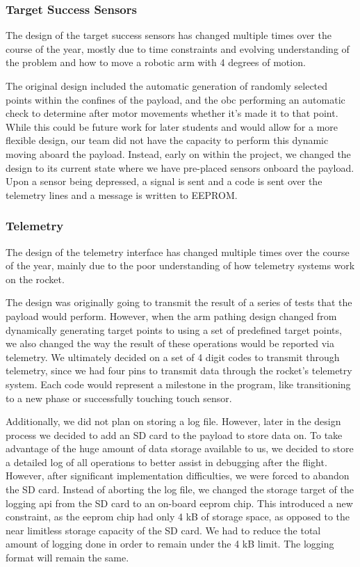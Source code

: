 \subsubsection{Target Success Sensors}
The design of the target success sensors has changed multiple times over the course of the year,
mostly due to time constraints and evolving understanding of the problem and how to move a robotic arm with 4
degrees of motion.

The original design included the automatic generation of randomly selected points within the confines of the payload,
and the \gls{obc} performing an automatic check to determine after motor movements whether it's made it to that point. While
this could be future work for later students and would allow for a more flexible design, our team did not have the capacity
to perform this dynamic moving aboard the \gls{payload}. Instead, early on within the project, we changed the design to its current state
where we have pre-placed sensors onboard the \gls{payload}. Upon a sensor being depressed, a signal is sent and a code is sent over 
the telemetry lines and a message is written to EEPROM.

\subsubsection{Telemetry}
The design of the telemetry interface has changed multiple times over the
course of the year, mainly due to the poor understanding of how telemetry systems
work on the rocket.

The design was originally going to transmit the result of a series of tests
that the \gls{payload} would perform.
However, when the arm pathing design changed from dynamically generating target 
points to using a set of predefined target points, we also changed the way the
result of these operations would be reported via telemetry.
We ultimately decided on a set of 4 digit codes to transmit through telemetry,
since we had four pins to transmit data through the rocket's telemetry system.
Each code would represent a milestone in the program, like transitioning to a
new phase or successfully touching touch sensor.

Additionally, we did not plan on storing a log file.
However, later in the design process we decided to add an SD card to the
\gls{payload} to store data on.
To take advantage of the huge amount of data storage available to us, we
decided to store a detailed log of all operations to better assist in debugging
after the flight.
However, after significant implementation difficulties, we were forced to
abandon the SD card.
Instead of aborting the log file, we changed the storage target of the logging
\gls{api} from the SD card to an on-board \gls{eeprom} chip.
This introduced a new constraint, as the \gls{eeprom} chip had only 4 kB of
storage space, as opposed to the near limitless storage capacity of the SD 
card.
We had to reduce the total amount of logging done in order to remain under
the 4 kB limit.
The logging format will remain the same.


